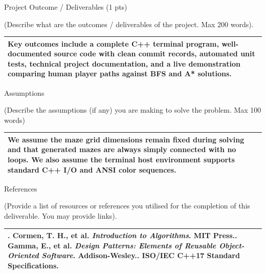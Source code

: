 \documentclass[12pt,a4paper]{article}
\newcommand{\secthead}[2]{%
  {\fontsize{18}{21.9}\selectfont\color{geheading}#1\par}\vspace{1.6pt}%
  {\fontsize{10.5}{14.5}\selectfont\color{gehint}#2\par}%
  \vspace{\secgap}}
\newlength{\secgap}\setlength{\secgap}{5.7pt}
\newcommand{\afterbox}{\vspace{\aftergap}}
\newlength{\aftergap}\setlength{\aftergap}{16pt}
\newenvironment{answerbox}{%
  \noindent\begin{tabular}{|p{485.1pt}|}\hline
  \fontsize{11}{13.6}\selectfont\setlength{\parskip}{4pt}\rule{0pt}{22.5pt}\ignorespaces}{%
  \rule[-16pt]{0pt}{0pt}\\\hline\end{tabular}\par}
\begin{document}
\secthead{Project Outcome / Deliverables (1 pts)}{(Describe what are the outcomes / deliverables of the project. Max 200 words).}
\begin{answerbox}
Key outcomes include a complete C++ terminal program, well-documented source code with clean commit records, automated unit tests, technical project documentation, and a live demonstration comparing human player paths against BFS and A* solutions.
\end{answerbox}
\afterbox

\secthead{Assumptions}{(Describe the assumptions (if any) you are making to solve the problem. Max 100 words)}
\begin{answerbox}
We assume the maze grid dimensions remain fixed during solving and that generated mazes are always simply connected with no loops. We also assume the terminal host environment supports standard C++ I/O and ANSI color sequences.
\end{answerbox}
\afterbox

\secthead{References}{(Provide a list of resources or references you utilised for the completion of this deliverable. You may provide links).}
\begin{answerbox}
1. Cormen, T. H., et al. \textit{Introduction to Algorithms}. MIT Press.\newline
2. Gamma, E., et al. \textit{Design Patterns: Elements of Reusable Object-Oriented Software}. Addison-Wesley.\newline
3. ISO/IEC C++17 Standard Specifications.
\end{answerbox}
\end{document}
